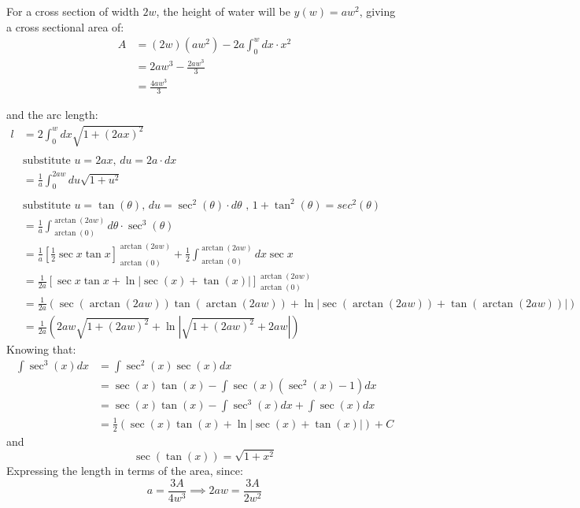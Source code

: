 \documentclass[12pt]{article}
\begin{document}
For a cross section of width $2w$, the height of water will be $y(w) = aw^2$, giving a cross sectional area of:
\begin{equation}
    \begin{split}
        A &= (2w)(aw^2) - 2a\int_0^w dx \cdot x^2
        \\ &=2aw^3 - \frac{2aw^3}{3}
        \\ &=\frac{4aw^3}{3}
    \end{split}
\end{equation}

and the arc length:
\begin{equation}
    \begin{split}
        l&=2\int_0^wdx\sqrt{1 + (2ax)^2}
        \\
        \\ &\text{substitute }u=2ax\text{, }du=2a\cdot dx
        \\&=\frac{1}{a}\int_0^{2aw}du\sqrt{1 + u^2}
        \\
        \\ &\text{substitute }u=\tan(\theta)\text{, }du=\sec^2(\theta)\cdot d\theta\text{ , }1 + \tan^2(\theta) = sec^2(\theta)
        \\&=\frac{1}{a}\int_{\arctan(0)}^{\arctan{(2aw)}} d\theta \cdot \sec^3(\theta)
        \\&=\frac{1}{a}\left[\frac{1}{2}\sec{x}\tan{x}\right]_{\arctan(0)}^{\arctan(2aw)}+ \frac{1}{2}\int_{\arctan(0)}^{\arctan(2aw)} dx\sec{x}
        \\&= \frac{1}{2a}\left[\sec{x}\tan{x} + \ln{|\sec(x)+\tan(x)|}\right]_{\arctan(0)}^{\arctan(2aw)}
        \\&= \frac{1}{2a}(\sec(\arctan(2aw))\tan(\arctan(2aw)) + \ln{|\sec(\arctan(2aw))+\tan(\arctan(2aw))|})
        \\&=\frac{1}{2a}(2aw\sqrt{1 + (2aw)^2}+ \ln{|\sqrt{1 + (2aw)^2} + 2aw|})
    \end{split}
\end{equation}
Knowing that:
\begin{equation}
    \begin{split}
         \int \sec^3(x)dx &= \int \sec^2(x)\sec(x)dx
         \\&=\sec(x)\tan(x)-\int\sec(x)(\sec^2(x)-1)dx
         \\&=\sec(x)\tan(x)-\int\sec^3(x)dx+\int\sec(x)dx
         \\&=\frac{1}{2}\left(\sec(x)\tan(x)+\ln{|\sec(x)+\tan(x)|}\right) + C
    \end{split}
\end{equation}
and
\begin{equation}
    \sec(\tan(x)) = \sqrt{1+x^2}
\end{equation}
Expressing the length in terms of the area, since:
\begin{equation}
    a = \frac{3A}{4w^3} \implies 2aw = \frac{3A}{2w^2}
\end{equation}
\end{document}
